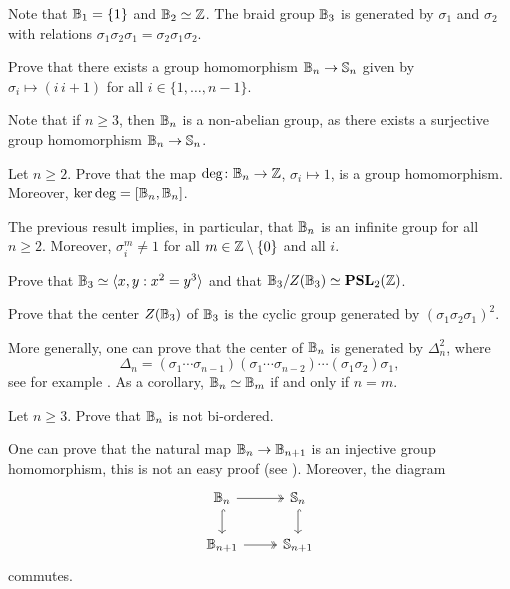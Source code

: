 Note that $\mathbb{B}_1=\{1\}$ and $\mathbb{B}_2\simeq\mathbb{Z}$. The braid 
group $\mathbb{B}_3$ is generated by
$\sigma_1$ and $\sigma_2$ with relations
$\sigma_1\sigma_2\sigma_1=\sigma_2\sigma_1\sigma_2$.

\begin{exercise}
    Prove that there exists a group homomorphism $\mathbb{B}_n\to\mathbb{S}_n$ 
    given by $\sigma_i\mapsto (i\,i+1)$ for all $i\in\{1,\dots,n-1\}$. 
\end{exercise}

Note that if $n\geq3$, then 
$\mathbb{B}_n$ is a non-abelian group, as there exists a surjective
group homomorphism $\mathbb{B}_n\to\mathbb{S}_n$. 

\begin{exercise}
    Let $n\geq 2$. 
    Prove that the map $\deg\colon\mathbb{B}_n\to\mathbb{Z}$, $\sigma_i\mapsto 1$, 
    is a group homomorphism. Moreover, $\ker\deg=[\mathbb{B}_n,\mathbb{B}_n]$. 
\end{exercise}

The previous result implies, in particular, that $\mathbb{B}_n$ is an infinite 
group for all $n\geq2$. Moreover, $\sigma_i^m\ne1$ for all $m\in\mathbb{Z}\setminus\{0\}$ and all $i$.  

\begin{exercise}
    Prove that $\mathbb{B}_3\simeq\langle x,y:x^2=y^3\rangle$ and that 
    $\mathbb{B}_3/Z(\mathbb{B}_3)\simeq\mathbf{PSL}_2(\mathbb{Z})$. 
\end{exercise}

\begin{exercise}
    Prove that the center $Z(\mathbb{B}_3)$ of $\mathbb{B}_3$ is
    the cyclic group generated by $(\sigma_1\sigma_2\sigma_1)^2$.
\end{exercise}

More generally, one can prove that
the center of $\mathbb{B}_n$ is generated by $\Delta_n^2$, where
\[
\Delta_n=(\sigma_1\cdots\sigma_{n-1})(\sigma_1\cdots\sigma_{n-2})\cdots(\sigma_1\sigma_2)\sigma_1, 
\]
see for example \cite[Theorem 1.24]{MR2435235}. 
As a corollary, $\mathbb{B}_n\simeq\mathbb{B}_m$ if and only if $n=m$. 

\begin{exercise}
    Let $n\geq3$. 
    Prove that $\mathbb{B}_n$ is not bi-ordered. 
\end{exercise}

One can prove that 
the natural map $\mathbb{B}_n\to\mathbb{B}_{n+1}$ is an injective group homomorphism, this is not an easy proof (see \cite[Corollary 1.14]{MR2435235}). Moreover,
the diagram
\[\begin{tikzcd}
	\B_n & \Sym_n \\
	\B_{n+1} & \Sym_{n+1}
	\arrow[two heads, from=1-1, to=1-2]
	\arrow[hook, from=1-2, to=2-2]
	\arrow[hook, from=1-1, to=2-1]
	\arrow[two heads, from=2-1, to=2-2]
\end{tikzcd}
\]
commutes. 

